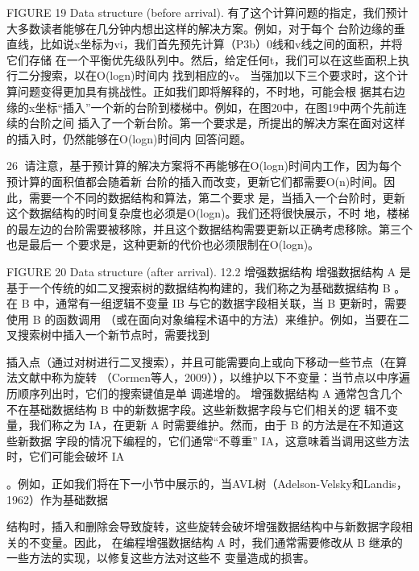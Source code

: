                FIGURE 19 Data structure (before arrival).
有了这个计算问题的指定，我们预计大多数读者能够在几分钟内想出这样的解决方案。例如，对于每个
台阶边缘的垂直线，比如说x坐标为vi，我们首先预先计算（P3b）0线和v线之间的面积，并将它们存储
在一个平衡优先级队列中。然后，给定任何t，我们可以在这些面积上执行二分搜索，以在O(logn)时间内
找到相应的v。
当强加以下三个要求时，这个计算问题变得更加具有挑战性。正如我们即将解释的，不时地，可能会根
据其右边缘的x坐标“插入”一个新的台阶到楼梯中。例如，在图20中，在图19中两个先前连续的台阶之间
插入了一个新台阶。第一个要求是，所提出的解决方案在面对这样的插入时，仍然能够在O(logn)时间内
回答问题。

                                                       26
请注意，基于预计算的解决方案将不再能够在O(logn)时间内工作，因为每个预计算的面积值都会随着新
台阶的插入而改变，更新它们都需要O(n)时间。因此，需要一个不同的数据结构和算法，第二个要求
是，当插入一个台阶时，更新这个数据结构的时间复杂度也必须是O(logn)。我们还将很快展示，不时
地，楼梯的最左边的台阶需要被移除，并且这个数据结构需要更新以正确考虑移除。第三个也是最后一
个要求是，这种更新的代价也必须限制在O(logn)。




                    FIGURE 20 Data structure (after arrival).
12.2 增强数据结构
增强数据结构 A 是基于一个传统的如二叉搜索树的数据结构构建的，我们称之为基础数据结构 B 。在
B 中，通常有一组逻辑不变量 IB 与它的数据字段相关联，当 B 更新时，需要使用 B 的函数调用
（或在面向对象编程术语中的方法）来维护。例如，当要在二叉搜索树中插入一个新节点时，需要找到
                        ​




插入点（通过对树进行二叉搜索），并且可能需要向上或向下移动一些节点（在算法文献中称为旋转
（Cormen等人，2009）），以维护以下不变量：当节点以中序遍历顺序列出时，它们的搜索键值是单
调递增的。
增强数据结构 A 通常包含几个不在基础数据结构 B 中的新数据字段。这些新数据字段与它们相关的逻
辑不变量，我们称之为 IA\B ，在更新 A 时需要维护。然而，由于 B 的方法是在不知道这些新数据
字段的情况下编程的，它们通常“不尊重” IA\B ，这意味着当调用这些方法时，它们可能会破坏 IA\B
                ​




。例如，正如我们将在下一小节中展示的，当AVL树（Adelson-Velsky和Landis，1962）作为基础数据
                                    ​                            ​




结构时，插入和删除会导致旋转，这些旋转会破坏增强数据结构中与新数据字段相关的不变量。因此，
在编程增强数据结构 A 时，我们通常需要修改从 B 继承的一些方法的实现，以修复这些方法对这些不
变量造成的损害。




